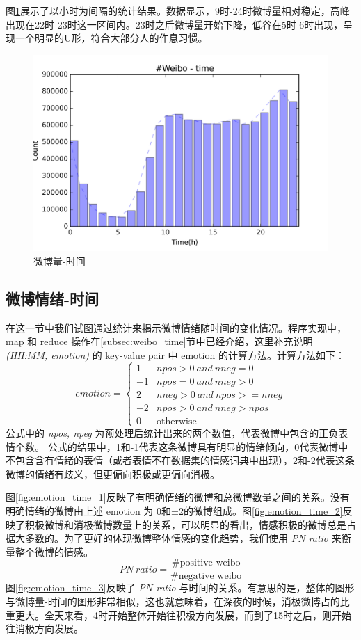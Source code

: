 \documentclass[12pt, oneside]{article}
\begin{document}
\begin{spacing}{1.5}
\begin{CJK}{UTF8}{gbsn}
图\ref{fig:weibo_time}展示了以小时为间隔的统计结果。数据显示，9时-24时微博量相对稳定，高峰出现在22时-23时这一区间内。23时之后微博量开始下降，低谷在5时-6时出现，呈现一个明显的U形，符合大部分人的作息习惯。

\begin{figure}
	\centering
	\includegraphics[width=0.8\linewidth]{../result/charts/weibo_time}
	\caption{微博量-时间}
	\label{fig:weibo_time}
\end{figure}

\subsection{微博情绪-时间}
\label{subsec:emotion_time}
在这一节中我们试图通过统计来揭示微博情绪随时间的变化情况。程序实现中， map 和 reduce 操作在\ref{subsec:weibo_time}节中已经介绍，这里补充说明 {\it(HH:MM, emotion)} 的 key-value pair 中 emotion 的计算方法。计算方法如下：
$$
emotion = 
\begin{cases}
1 & npos > 0~and~nneg = 0 \\
-1 & npos = 0~and~nneg > 0 \\
2 & nneg > 0~and~npos >= nneg \\
-2 & npos > 0~and~nneg > npos \\
0 & \text{otherwise}
\end{cases}
$$
公式中的 {\it npos, npeg} 为预处理后统计出来的两个数值，代表微博中包含的正负表情个数。 公式的结果中，1和-1代表这条微博具有明显的情绪倾向，0代表微博中不包含含有情绪的表情（或者表情不在数据集的情感词典中出现），2和-2代表这条微博的情绪有歧义，但更偏向积极或更偏向消极。

图\ref{fig:emotion_time_1}反映了有明确情绪的微博和总微博数量之间的关系。没有明确情绪的微博由上述 emotion 为 0和±2的微博组成。图\ref{fig:emotion_time_2}反映了积极微博和消极微博数量上的关系，可以明显的看出，情感积极的微博总是占据大多数的。为了更好的体现微博整体情感的变化趋势，我们使用 {\it PN ratio} 来衡量整个微博的情感。
$$PN~ratio = \frac{\text{\#positive weibo}}{\text{\#negative weibo}}$$
图\ref{fig:emotion_time_3}反映了 {\it PN ratio} 与时间的关系。有意思的是，整体的图形与微博量-时间的图形非常相似，这也就意味着，在深夜的时候，消极微博占的比重更大。全天来看，4时开始整体开始往积极方向发展，而到了15时之后，则开始往消极方向发展。


\end{CJK}
\end{spacing}
\end{document}
